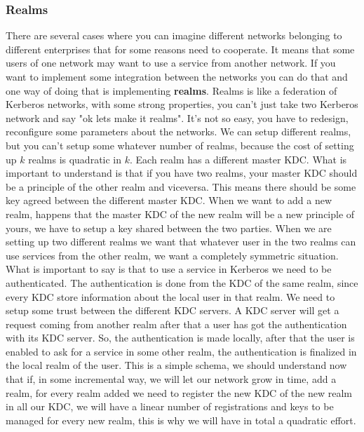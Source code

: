 \documentclass[11pt]{article}
\begin{document}
\subsubsection{Realms}
There are several cases where you can imagine different networks belonging to different enterprises that for some reasons need to cooperate. It means that some users of one network may want to use a service from another network. If you want to implement some integration between the networks you can do that and one way of doing that is implementing \textbf{realms}. Realms is like a federation of Kerberos networks, with some strong properties, you can't just take two Kerberos network and say "ok lets make it realms". It's not so easy, you have to redesign, reconfigure some parameters about the networks. We can setup different realms, but you can't setup some whatever number of realms, because the cost of setting up $k$ realms is quadratic in $k$. Each realm has a different master KDC. What is important to understand is that if you have two realms, your master KDC should be a principle of the other realm and viceversa. This means there should be some key agreed between the different master KDC. When we want to add a new realm, happens that the master KDC of the new realm will be a new principle of yours, we have to setup a key shared between the two parties. When we are setting up two different realms we want that whatever user in the two realms can use services from the other realm, we want a completely symmetric situation. What is important to say is that to use a service in Kerberos we need to be authenticated. The authentication is done from the KDC of the same realm, since every KDC store information about the local user in that realm. We need to setup some trust between the different KDC servers. A KDC server will get a request coming from another realm after that a user has got the authentication with its KDC server. So, the authentication is made locally, after that the user is enabled to ask for a service in some other realm, the authentication is finalized in the local realm of the user. This is a simple schema, we should understand now that if, in some incremental way, we will let our network grow in time, add a realm, for every realm added we need to register the new KDC of the new realm in all our KDC, we will have a linear number of registrations and keys to be managed for every new realm, this is why we will have in total a quadratic effort. 
\end{document}
